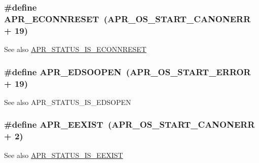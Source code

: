 \subsubsection[{\texorpdfstring{A\+P\+R\+\_\+\+E\+C\+O\+N\+N\+R\+E\+S\+ET}{APR_ECONNRESET}}]{\setlength{\rightskip}{0pt plus 5cm}\#define A\+P\+R\+\_\+\+E\+C\+O\+N\+N\+R\+E\+S\+ET~({\bf A\+P\+R\+\_\+\+O\+S\+\_\+\+S\+T\+A\+R\+T\+\_\+\+C\+A\+N\+O\+N\+E\+RR} + 19)}\hypertarget{group__APR__Error_ga264bfe2056e917728e9ed060b58869c2}{}\label{group__APR__Error_ga264bfe2056e917728e9ed060b58869c2}
\begin{DoxySeeAlso}{See also}
\hyperlink{group__APR__STATUS__IS_ga85e2cb1b4c904a9edfbc0d94203f76b6}{A\+P\+R\+\_\+\+S\+T\+A\+T\+U\+S\+\_\+\+I\+S\+\_\+\+E\+C\+O\+N\+N\+R\+E\+S\+ET} 
\end{DoxySeeAlso}
\subsubsection[{\texorpdfstring{A\+P\+R\+\_\+\+E\+D\+S\+O\+O\+P\+EN}{APR_EDSOOPEN}}]{\setlength{\rightskip}{0pt plus 5cm}\#define A\+P\+R\+\_\+\+E\+D\+S\+O\+O\+P\+EN~({\bf A\+P\+R\+\_\+\+O\+S\+\_\+\+S\+T\+A\+R\+T\+\_\+\+E\+R\+R\+OR} + 19)}\hypertarget{group__APR__Error_gac96fbde76282364e8c482d6f23bc61bb}{}\label{group__APR__Error_gac96fbde76282364e8c482d6f23bc61bb}
\begin{DoxySeeAlso}{See also}
A\+P\+R\+\_\+\+S\+T\+A\+T\+U\+S\+\_\+\+I\+S\+\_\+\+E\+D\+S\+O\+P\+EN 
\end{DoxySeeAlso}
\subsubsection[{\texorpdfstring{A\+P\+R\+\_\+\+E\+E\+X\+I\+ST}{APR_EEXIST}}]{\setlength{\rightskip}{0pt plus 5cm}\#define A\+P\+R\+\_\+\+E\+E\+X\+I\+ST~({\bf A\+P\+R\+\_\+\+O\+S\+\_\+\+S\+T\+A\+R\+T\+\_\+\+C\+A\+N\+O\+N\+E\+RR} + 2)}\hypertarget{group__APR__Error_gafa7f353804388017a0ea71bc14f0dda5}{}\label{group__APR__Error_gafa7f353804388017a0ea71bc14f0dda5}
\begin{DoxySeeAlso}{See also}
\hyperlink{group__APR__STATUS__IS_ga37707a0f41b084f1ce1a13575f4f21db}{A\+P\+R\+\_\+\+S\+T\+A\+T\+U\+S\+\_\+\+I\+S\+\_\+\+E\+E\+X\+I\+ST} 
\end{DoxySeeAlso}
